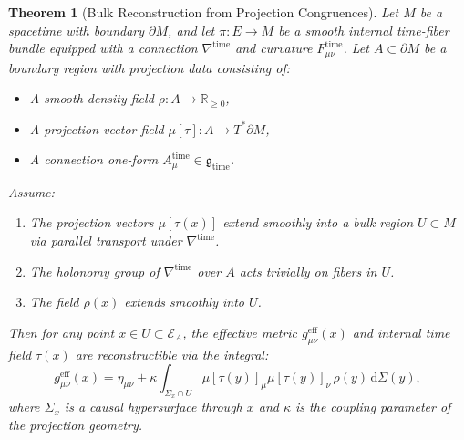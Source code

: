 \documentclass[11pt]{article}
\newtheorem{theorem}{Theorem}
\begin{document}
\begin{theorem}[Bulk Reconstruction from Projection Congruences]
Let \( M \) be a spacetime with boundary \( \partial M \), and let \( \pi: E \to M \) be a smooth internal time-fiber bundle equipped with a connection \( \nabla^{\mathrm{time}} \) and curvature \( F^{\mathrm{time}}_{\mu\nu} \). Let \( A \subset \partial M \) be a boundary region with projection data consisting of:
\begin{itemize}
  \item A smooth density field \( \rho: A \to \mathbb{R}_{\geq 0} \),
  \item A projection vector field \( \mu[\tau]: A \to T^* \partial M \),
  \item A connection one-form \( A^{\mathrm{time}}_\mu \in \mathfrak{g}_{\mathrm{time}} \).
\end{itemize}
Assume:
\begin{enumerate}
  \item The projection vectors \( \mu[\tau(x)] \) extend smoothly into a bulk region \( U \subset M \) via parallel transport under \( \nabla^{\mathrm{time}} \).
  \item The holonomy group of \( \nabla^{\mathrm{time}} \) over \( A \) acts trivially on fibers in \( U \).
  \item The field \( \rho(x) \) extends smoothly into \( U \).
\end{enumerate}
Then for any point \( x \in U \subset \mathcal{E}_A \), the effective metric \( g^{\mathrm{eff}}_{\mu\nu}(x) \) and internal time field \( \tau(x) \) are reconstructible via the integral:
\[
g^{\mathrm{eff}}_{\mu\nu}(x) = \eta_{\mu\nu} + \kappa \int_{\Sigma_x \cap U} \mu[\tau(y)]_\mu \mu[\tau(y)]_\nu \, \rho(y) \, \mathrm{d}\Sigma(y),
\]
where \( \Sigma_x \) is a causal hypersurface through \( x \) and \( \kappa \) is the coupling parameter of the projection geometry.
\end{theorem}
\end{document}

